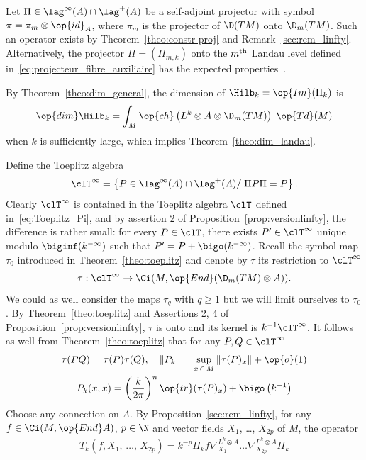 Let $\Pi \in \lag^{\infty}(A) \cap \lag^{+} (A)$ be a self-adjoint projector with symbol $\pi= \pi_m \otimes \op{id}_A$, where $\pi_m$ is the projector of $\D (TM)$ onto $\D_m (TM)$. Such an operator exists by Theorem~\ref{theo:constr-proj} and Remark~\ref{sec:rem_linfty}. Alternatively, the projector $\Pi = (\Pi_{m,k})$ onto the $m^{\rm th}$ Landau level defined in~\eqref{eq:projecteur_fibre_auxiliaire} has the expected properties~\cite[Theorems~5.2, 5.3]{oim_copain}.

By Theorem~\ref{theo:dim_general}, the dimension of $\Hilb_k= \op{Im}(\Pi_k)$ is
\[
\op{dim} \Hilb_k = \int_M \op{ch} \left(L^k \otimes A \otimes \D_m(TM)\right) \; \op{Td}
(M)
\]
when $k$ is sufficiently large, which implies Theorem~\ref{theo:dim_landau}.

Define the Toeplitz algebra
\[
\clT^{\infty} = \left\{ P \in \lag^{\infty}(A) \cap \lag^{+}
(A)/\; \Pi P \Pi = P \right\}.
\]
Clearly $\clT^{\infty}$ is contained in the Toeplitz algebra $\clT$ defined in~\eqref{eq:Toeplitz_Pi}, and by assertion 2 of Proposition~\ref{prop:versionlinfty}, the difference is rather small: for every $ P \in
\clT$, there exists $P' \in \clT^{\infty}$ unique modulo $\biginf (k^{-\infty})$ such that $P' = P + \bigo (k^{-\infty})$. Recall the symbol map $\tau_0$ introduced in Theorem~\ref{theo:toeplitz} and denote by $\tau$ its restriction to $\clT^{\infty}$
\[
\tau : \clT^{\infty} \rightarrow \Ci (M, \op{End} (\D_m (TM) \otimes A))
.
\]
We could as well consider the maps $\tau_q$ with $q \geqslant 1$ but we will limit ourselves to $\tau_0$. By Theorem~\ref{theo:toeplitz} and Assertions 2, 4 of Proposition~\ref{prop:versionlinfty}, $\tau$ is onto and its kernel is $k^{-1}
\clT^{\infty}$. It follows as well from Theorem~\ref{theo:toeplitz} that for any $P,Q \in \clT^{\infty}$
\begin{gather*}
\tau (PQ) = \tau (P) \tau (Q), \quad \| P_k \| = \sup_{x\, \in\,M} \|
\tau(P)_x\| + \op{o} (1) \\
P_k (x,x) = \left(\frac{k}{2\pi} \right)^n \op{tr} (\tau (P)_x) + \bigo \left(k^{-1}\right)
\end{gather*}
Choose any connection on $A$. By Proposition~\ref{sec:rem_linfty}, for any $ f \in \Ci (M, \op{End} A)$, $p \in \N$ and vector fields $X_1$, \ldots, $X_{2p}$ of $M$, the operator
\begin{gather}\label{eq:toeplitz_mult_der}
T_k \left(f, X_1,\, \ldots,\, X_{2p}\right) = k^{-p} \Pi_k f \nabla_{X_1}^{L^k \otimes A}
\ldots \nabla_{X_{2p}}^{L^k \otimes A}
\Pi_k
\end{gather}
